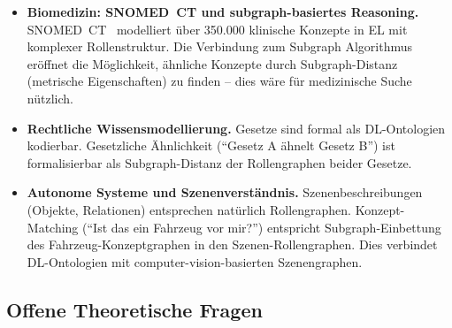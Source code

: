 ﻿\documentclass[a4paper,12pt]{article}
\theoremstyle{definition}
\theoremstyle{plain}
\theoremstyle{remark}
\begin{document}
\begin{itemize}
  \item \textbf{Biomedizin: SNOMED~CT und subgraph-basiertes Reasoning.}
        SNOMED~CT~\cite{SNOMED} modelliert {\"u}ber 350.000 klinische
        Konzepte in \textsf{EL} mit komplexer Rollenstruktur.
        Die Verbindung zum Subgraph Algorithmus er{\"o}ffnet die M{\"o}glichkeit,
        {\"a}hnliche Konzepte durch Subgraph-Distanz (metrische Eigenschaften)
        zu finden -- dies w{\"a}re f{\"u}r medizinische Suche n{\"u}tzlich.

  \item \textbf{Rechtliche Wissensmodellierung.}
        Gesetze sind formal als DL-Ontologien kodierbar.
        Gesetzliche {\"A}hnlichkeit (``Gesetz A {\"a}hnelt Gesetz B'') ist
        formalisierbar als Subgraph-Distanz der Rollengraphen beider Gesetze.

  \item \textbf{Autonome Systeme und Szenenverst{\"a}ndnis.}
        Szenenbeschreibungen (Objekte, Relationen) entsprechen
        nat{\"u}rlich Rollengraphen.
        Konzept-Matching (``Ist das ein Fahrzeug vor mir?'')
        entspricht Subgraph-Einbettung des Fahrzeug-Konzeptgraphen
        in den Szenen-Rollengraphen.
        Dies verbindet DL-Ontologien mit computer-vision-basierten
        Szenengraphen.
\end{itemize}

\subsection{Offene Theoretische Fragen}
\end{document}
